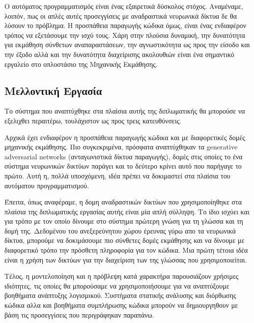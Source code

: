 Ο αυτόματος προγραμματισμός είναι ένας εξαιρετικά δύσκολος στόχος. 
Αναμέναμε, λοιπόν, πως οι απλές αυτές προσεγγίσεις με αναδραστικά νευρωνικά δίκτυα δε θα λύσουν το πρόβλημα.
Η προσπάθεια παραγωγής κώδικα όμως, είναι ένας ενδιαφέρον τρόπος να εξετάσουμε την ισχύ τους. 
Χάρη στην πλούσια δυναμική, την δυνατότητα για εκμάθηση σύνθετων αναπαραστάσεων, την αγνωστικότητα ως προς την είσοδο και την έξοδο αλλά και την δυνατότητα διαχείρισης ακολουθιών είναι ένα σημαντικό εργαλείο στο οπλοστάσιο της Μηχανικής Εκμάθησης. 


\subsection{Μελλοντική Εργασία}

Το σύστημα που αναπτύχθηκε στα πλαίσια αυτής της διπλωματικής θα μπορούσε να εξελιχθει περαιτέρω, τουλάχιστον ως προς τρεις κατευθύνσεις.

Αρχικά έχει ενδιαφέρον η προσπάθεια παραγωγής κώδικα και με διαφορετικές δομές μηχανικής εκμάθησης.
Πιο συγκεκριμένα, πρόσφατα αναπτύχθηκαν τα generative adversarial networks \cite{} (ανταγωνιστικά δίκτυα παραγωγής), δομές στις οποίες το ένα σύστημα νευρωνικών δικτύων παράγει και το δεύτερο κρίνει αυτό που παρήγαγε το πρώτο.
Αυτή η, πολλά υποσχόμενη, ιδέα πρέπει να δοκιμαστεί στα πλαίσια του αυτόματου προγραμματισμού.

Έπειτα, όπως αναφέραμε, η δομη αναδραστικών δικτύων που χρησιμοποίηθηκε στα πλαίσια της διπλωματικής εργασίας αυτής είναι μία απλή σύλληψη.
Το ίδιο ισχύει και για τρόπο με τον οποίο δίνουμε στο σύστημα πρώτερη γνώση για τη γλώσσα και τη δομή της.
Δεδομένου του ανεξερεύνητου χώρου έρευνας γύρω απο τα νευρωνικά δίκτυα, μπορούμε να δοκιμάσουμε πιο σύνθετες δομές εκμάθησης και να δίνουμε με διαφορετικό τρόπο την πρόσθετη πληροφορία για τον κώδικα.
Μια πρώτη τέτοια ιδέα είναι η χρήση των  δικτύων για την διαχείριση των  της γλώσσας που χρησιμοποιείται.

Τέλος, η μοντελοποίηση και η πρόβλεψη κατά χαρακτήρα παρουσιάζουν χρήσιμες ιδιότητες, τις οποίες θα μπορούσαμε να χρησιμοποιήσουμε για να αναπτύξουμε βοηθήματα ανάπτυξης λογισμικού.
Συστήματα στατικής ανάλυσης και διόρθωσης κώδικα αλλα και βοηθήματα συμπλήρωσης κώδικα μπορούν να δημιουργηθουν με βάση τις προσεγγίσεις που περιγράφηκαν παραπάνω.